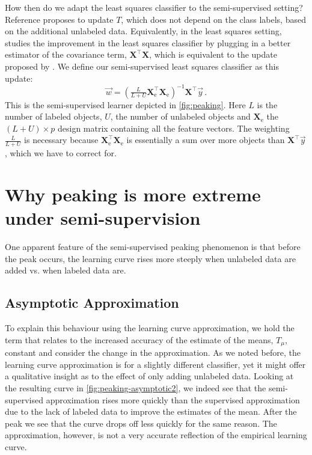 \documentclass[runningheads,a4paper]{llncs}\usepackage[]{graphicx}\usepackage[]{color}
\begin{document}
How then do we adapt the least squares classifier to the semi-supervised setting? Reference \cite{Fan2008} proposes to update $T$, which does not depend on the class labels, based on the additional unlabeled data. Equivalently, in the least squares setting, \cite{Shaffer1991} studies the improvement in the least squares classifier by plugging in a better estimator of the covariance term, $\mathbf{X}^\top \mathbf{X}$, which is equivalent to the update proposed by \cite{Fan2008}. We define our semi-supervised least squares classifier as this update:
\begin{equation}
\vec{w} = (\tfrac{L}{L+U} \mathbf{X}_\textrm{e}^\top \mathbf{X}_\textrm{e})^{-1} \mathbf{X}^\top \vec{y} \,. \label{eq:solutionsemisupervised}
\end{equation}
This is the semi-supervised learner depicted in \cref{fig:peaking}. Here $L$ is the number of labeled objects, $U$, the number of unlabeled objects and $\mathbf{X}_\textrm{e}$ the $(L+U) \times p$ design matrix containing all the feature vectors. The weighting $\tfrac{L}{L+U}$ is necessary because $\mathbf{X}_\textrm{e}^\top \mathbf{X}_\textrm{e}$ is essentially a sum over more objects than $\mathbf{X}^\top \vec{y}$, which we have to correct for.

\section{Why peaking is more extreme under semi-supervision} \label{section:incline}
One apparent feature of the semi-supervised peaking phenomenon is that before the peak occurs, the learning curve rises more steeply when unlabeled data are added vs. when labeled data are.

\subsection{Asymptotic Approximation} \label{section:inclineasymptotic}
To explain this behaviour using the learning curve approximation, we hold the term that relates to the increased accuracy of the estimate of the means, $T_\mu$, constant and consider the change in the approximation. As we noted before, the learning curve approximation is for a slightly different classifier, yet it might offer a qualitative insight as to the effect of only adding unlabeled data. Looking at the resulting curve in \cref{fig:peaking-asymptotic2}, we indeed see that the semi-supervised approximation rises more quickly than the supervised approximation due to the lack of labeled data to improve the estimates of the mean. After the peak we see that the curve drops off less quickly for the same reason. The approximation, however, is not a very accurate reflection of the empirical learning curve.
\end{document}
